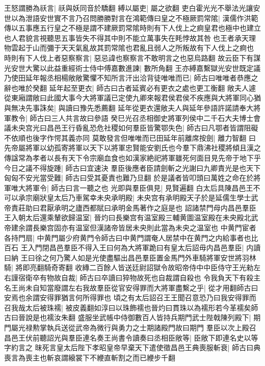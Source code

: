 王怒謂勝為祅言|{
	祅與妖同音於驕翻}
縛以屬吏|{
	屬之欲翻}
吏白霍光光不舉法光讓安世以為泄語安世實不言乃召問勝勝對言在鴻範傳曰皇之不極厥罰常隂|{
	漢儒作洪範傳以五事應五行皇之不極是謂不建厥罰常隂時則有下人伐上之痾皇君也極中也建立也人君貌言視聽思五事皆失不得其中則不能立萬事失在眊悖故其咎也王者承天理物雲起于山而彌于天天氣亂故其罰常隂也君亂且弱人之所叛故有下人伐上之痾也}
時則有下人伐上者惡察察言|{
	惡忌諱也察察言不敢明言之也惡烏路翻}
故云臣下有謀光安世大驚以此益重經術士侍中傅嘉數進諫|{
	數所角翻}
王亦縛嘉繫獄光安世既定議乃使田延年報丞相楊敞敞驚懼不知所言汗出洽背徒唯唯而已|{
	師古曰唯唯者恭應之辭也唯於癸翻}
延年起至更衣|{
	師古曰古者延賓必有更衣之處也更工衡翻}
敞夫人遽從東廂謂敞曰此國大事今大將軍議已定使九卿來報君侯君侯不疾應與大將軍同心猶與無决先事誅矣|{
	與讀曰豫先悉薦翻}
延年從更衣還敞夫人與延年參語許諾請奉大將軍教令|{
	師古曰三人共言故曰參語}
癸巳光召丞相御史將軍列侯中二千石大夫博士會議未央宫光曰昌邑王行昏亂恐危社稷如何羣臣皆驚鄂失色|{
	師古曰凡鄂者皆謂阻礙不依順也後字作愕其義亦同}
莫敢發言但唯唯而已田延年前離席按劍|{
	離力智翻}
曰先帝屬將軍以幼孤寄將軍以天下以將軍忠賢能安劉氏也今羣下鼎沸社稷將傾且漢之傳諡常為孝者以長有天下令宗廟血食也如漢家絶祀將軍雖死何面目見先帝于地下乎今日之議不得旋踵|{
	師古曰宜速決}
羣臣後應者臣請劍斬之光謝曰九卿責光是也天下匈匈不安光當受難|{
	師古曰受其憂責也難乃旦翻}
於是議者皆叩頭曰萬姓之命在於將軍唯大將軍令|{
	師古曰言一聽之也}
光即與羣臣俱見|{
	見賢遍翻}
白太后具陳昌邑王不可以承宗廟狀皇太后乃車駕幸未央承明殿|{
	未央宫有承明殿天子於是延儒生學士武帝責莊助曰君厭承明之廬西都賦曰承明金馬著作之庭是也}
詔諸禁門母内昌邑羣臣王入朝太后還乘輦欲歸温室|{
	晉灼曰長樂宫有温室殿三輔黄圖温室殿在未央殿北武帝建余謂長樂宫固亦有温室但漢諸帝皆居未央則此當為未央之温室也}
中黄門宦者各持門扇|{
	中黄門屬少府黄門令師古曰中黄門謂奄人居禁中在黄門之内給事者也比百石}
王入門閉昌邑羣臣不得入王曰何為大將軍跪曰有皇太后詔毋内昌邑羣臣|{
	内讀曰納}
王曰徐之何乃驚人如是光使盡驅出昌邑羣臣置金馬門外車騎將軍安世將羽林騎|{
	將即亮翻騎奇寄翻}
收縳二百餘人皆送廷尉詔獄令故昭帝侍中中臣侍守王光勑左右謹宿衛卒有物故自裁|{
	師古曰卒讀曰猝物故死也自裁謂自殺也}
令我負天下有殺主名王尚未自知當廢謂左右我故羣臣從官安得罪而大將軍盡繫之乎|{
	從才用翻師古曰安焉也余謂安得罪猶言何所得罪也}
頃之有太后詔召王王聞召意恐乃曰我安得罪而召我哉太后被珠襦|{
	被皮義翻如淳曰以珠飾襦也晉灼曰貫珠以為襦形若今革襦矣師古曰晉說是也襦汝朱翻}
盛服坐武帳中侍御數百人皆持兵期門武士陛戟陳列殿下|{
	期門屬光禄勲掌執兵送從武帝為微行與勇力之士期諸殿門故曰期門}
羣臣以次上殿召昌邑王伏前聽詔光與羣臣連名奏王尚書令讀奏曰丞相臣敞等|{
	臣敞下即連名史以等字約言之}
昩死言皇太后陛下孝昭皇帝早棄天下遣使徵昌邑王典喪服斬衰|{
	師古曰典喪言為喪主也斬哀謂縗裳下不緶直斬割之而已緶步千翻}
